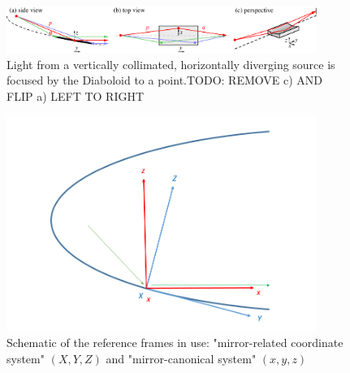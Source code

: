 \documentclass{iucr}              %
\newcommand{\inblue}[1]{{\color{blue}#1}}
\newcommand{\inred}[1]{{\color{red}#1}}
\begin{document}
\begin{figure}\label{fig:kenFig1}
\centering
\includegraphics[width=0.9\textwidth]{figures/Diaboloid_Fig1.pdf}
\caption{\inblue{Light from a vertically collimated, horizontally diverging source is focused by the Diaboloid to a point.TODO: REMOVE c) AND FLIP a) LEFT TO RIGHT }}
\end{figure}




\begin{figure}\label{fig:frame}
\centering
\includegraphics[width=0.9\textwidth]{figures/diaboloid_frame.png}
\caption{Schematic of the reference frames in use: "mirror-related coordinate system" $(X,Y,Z)$ and "mirror-canonical system" $(x,y,z)$}
\end{figure}
\end{document}
